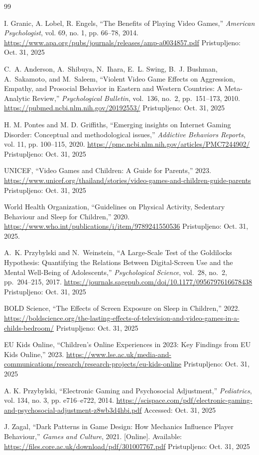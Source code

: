 \documentclass[a4paper,12pt]{article}
\begin{document}
\newpage
\begin{thebibliography}{99}

I. Granic, A. Lobel, R. Engels, 
``The Benefits of Playing Video Games,''
\textit{American Psychologist}, vol. 69, no. 1, pp. 66–78, 2014.
\url{https://www.apa.org/pubs/journals/releases/amp-a0034857.pdf}
Pristupljeno: Oct. 31, 2025

C.~A. Anderson, A.~Shibuya, N.~Ihara, E.~L. Swing, B.~J. Bushman, A.~Sakamoto, and M.~Saleem,
``Violent Video Game Effects on Aggression, Empathy, and Prosocial Behavior in Eastern and Western Countries: A Meta-Analytic Review,''
\textit{Psychological Bulletin}, vol.~136, no.~2, pp.~151--173, 2010.
\url{https://pubmed.ncbi.nlm.nih.gov/20192553/}
Pristupljeno: Oct. 31, 2025

H. M. Pontes and M. D. Griffiths,
``Emerging insights on Internet Gaming Disorder: Conceptual and methodological issues,''
\textit{Addictive Behaviors Reports}, vol. 11, pp. 100–115, 2020.
\url{https://pmc.ncbi.nlm.nih.gov/articles/PMC7244902/}
Pristupljeno: Oct. 31, 2025

UNICEF,
``Video Games and Children: A Guide for Parents,''
2023.
\url{https://www.unicef.org/thailand/stories/video-games-and-children-guide-parents}
Pristupljeno: Oct. 31, 2025

World Health Organization,
``Guidelines on Physical Activity, Sedentary Behaviour and Sleep for Children,'' 2020.
\url{https://www.who.int/publications/i/item/9789241550536}
Pristupljeno: Oct. 31, 2025.

A.~K. Przybylski and N.~Weinstein,
``A Large-Scale Test of the Goldilocks Hypothesis: Quantifying the Relations Between Digital-Screen Use and the Mental Well-Being of Adolescents,''
\textit{Psychological Science}, vol.~28, no.~2, pp.~204--215, 2017.
\url{https://journals.sagepub.com/doi/10.1177/0956797616678438}
Pristupljeno: Oct. 31, 2025

BOLD Science,
``The Effects of Screen Exposure on Sleep in Children,'' 2022.
\url{https://boldscience.org/the-lasting-effects-of-television-and-video-games-in-a-childs-bedroom/}
Pristupljeno: Oct. 31, 2025

EU Kids Online,
``Children’s Online Experiences in 2023: Key Findings from EU Kids Online,''
2023.
\url{https://www.lse.ac.uk/media-and-communications/research/research-projects/eu-kids-online}
Pristupljeno: Oct. 31, 2025

A. K. Przybylski,
``Electronic Gaming and Psychosocial Adjustment,''
\textit{Pediatrics}, vol. 134, no. 3, pp. e716–e722, 2014.
\url{https://scispace.com/pdf/electronic-gaming-and-psychosocial-adjustment-z8wb3d4hbi.pdf}
Accessed: Oct. 31, 2025

J. Zagal,
``Dark Patterns in Game Design: How Mechanics Influence Player Behaviour,''
\textit{Games and Culture}, 2021.
[Online]. Available: \url{https://files.core.ac.uk/download/pdf/301007767.pdf}
Pristupljeno: Oct. 31, 2025

\end{thebibliography}
\end{document}
